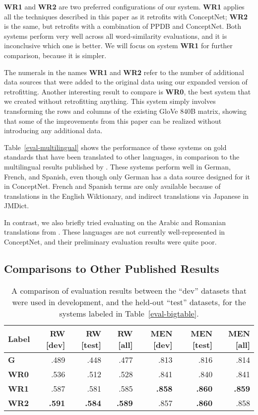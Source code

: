 \documentclass[11pt,letterpaper]{article}
\begin{document}
{\bf WR1} and {\bf WR2} are two preferred configurations of our system. {\bf WR1}
applies all the techniques described in this paper as it retrofits with
ConceptNet; {\bf WR2} is the same, but retrofits with a combination of PPDB and
ConceptNet. Both systems perform very well across all word-similarity
evaluations, and it is inconclusive which one is better. We will focus on
system {\bf WR1} for further comparison, because it is simpler.

The numerals in the names {\bf WR1} and {\bf WR2} refer to the number of
additional data sources that were added to the original data using our expanded
version of retrofitting. Another interesting result to compare is {\bf WR0},
the best system that we created without retrofitting anything. This system
simply involves transforming the rows and columns of the existing GloVe 840B
matrix, showing that some of the improvements from this paper can be realized
without introducing any additional data.

Table~\ref{eval-multilingual} shows the performance of these systems on
gold standards that have been translated to other languages, in comparison to
the multilingual results published by .
These systems perform well in German, French, and Spanish, even though only
German has a data source designed for it in ConceptNet. French and Spanish terms
are only available because of translations in the English Wiktionary, and
indirect translations via Japanese in JMDict.

In contrast, we also briefly tried evaluating on the Arabic and Romanian
translations from . These languages are not
currently well-represented in ConceptNet, and their preliminary evaluation
results were quite poor.

\subsection{Comparisons to Other Published Results}

\begin{table*}[t]
\centering
\begin{tabular}{lrrrrrr}
\toprule
Label   & RW [dev] & RW [test] & RW [all] & MEN [dev] & MEN [test] & MEN [all]\\
\midrule
\bf G   &    .489  &    .448  &    .477  &    .813  &    .816 &    .814 \\
\bf WR0 &    .536  &    .512  &    .528  &    .841  &    .840 &    .841 \\
\bf WR1 &    .587  &    .581  &    .585  &\bf .858  &\bf .860 &\bf .859 \\
\bf WR2 &\bf .591  &\bf .584  &\bf .589  &    .857  &\bf .860 &    .858 \\
\bottomrule
\end{tabular}

\caption{
    A comparison of evaluation results between the ``dev'' datasets that were
    used in development, and the held-out ``test'' datasets, for the systems
    labeled in Table~\ref{eval-bigtable}.
}
\label{eval-dev-test}
\end{table*}
\end{document}
